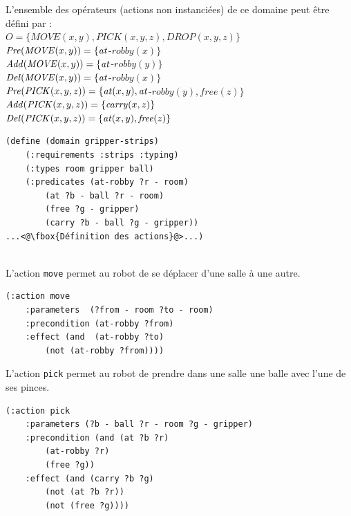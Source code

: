 \noindent L'ensemble des opérateurs (actions non instanciées) de ce domaine peut être défini par :\\ $O=\{\mathit{MOVE}(x,y),\mathit{PICK}(x,y,z),\mathit{DROP}(x,y,z)\}$\\

\noindent $\mathit{Pre}(\mathit{MOVE}(x,y)) = \{\mathit{at}$-$\mathit{robby}(x)\}$\\
$\mathit{Add}(\mathit{MOVE}(x,y)) = \{\mathit{at}$-$\mathit{robby}(y)\}$\\
$\mathit{Del}(\mathit{MOVE}(x,y)) = \{\mathit{at}$-$\mathit{robby}(x)\}$\\

\noindent $\mathit{Pre}(\mathit{PICK}(x,y,z)) = \{\mathit{at}(x,y),\mathit{at}$-$\mathit{robby}(y),\mathit{free}(z)\}$\\
$\mathit{Add}(\mathit{PICK}(x,y,z)) = \{\mathit{carry}(x,z)\}$\\
$\mathit{Del}(\mathit{PICK}(x,y,z)) = \{\mathit{at}(x,y),\mathit{free}(z)\}$\\




\begin{lstlisting}[language=pddl,frame=single]
(define (domain gripper-strips)
    (:requirements :strips :typing)
    (:types room gripper ball)
    (:predicates (at-robby ?r - room)
        (at ?b - ball ?r - room)
        (free ?g - gripper)
        (carry ?b - ball ?g - gripper))
...<@\fbox{Définition des actions}@>...)
\end{lstlisting}

\\
\noindent L'action \texttt{move} permet au robot de se déplacer d'une salle à une autre.

\begin{lstlisting}[language=pddl,frame=single]
(:action move
    :parameters  (?from - room ?to - room)
    :precondition (at-robby ?from)
    :effect (and  (at-robby ?to)
        (not (at-robby ?from))))
\end{lstlisting}

\noindent L'action \texttt{pick} permet au robot de prendre dans une salle une balle avec l'une de ses pinces.

\begin{lstlisting}[language=pddl,frame=single]
(:action pick
    :parameters (?b - ball ?r - room ?g - gripper)
    :precondition (and (at ?b ?r)
        (at-robby ?r)
        (free ?g))
    :effect (and (carry ?b ?g)
        (not (at ?b ?r))
        (not (free ?g))))
\end{lstlisting}

